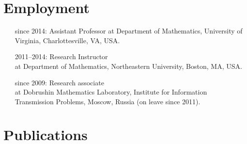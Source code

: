 \documentclass[letterpaper,11pt]{article}
\begin{document}
\section*{Employment}

\begin{itemize}
\item[since 2014:]
Assistant Professor
at Department of Mathematics, 
University of Virginia, 
Charlottesville, VA, USA.

\item[2011--2014:]
Research Instructor\\ at
Department of Mathematics,
Northeastern University, Boston, MA, USA.

\item[since 2009:]
Research associate\\
at
Dobrushin Mathematics Laboratory,
Institute for Information Transmission Problems, Moscow, Russia (on leave since 2011).
\end{itemize}


\section*{Publications}
\end{document}
